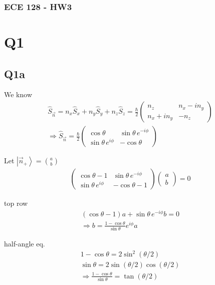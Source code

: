 \documentclass[
]{article}
\author{}
\date{}
\providecommand{\ket}[1]{\left\lvert #1 \right\rangle}
\providecommand{\Rarr}{\Rightarrow}
\begin{document}
\subsubsection*{ECE 128 - HW3}

\section{Q1}

\subsection{Q1a}

We know
\begin{gather*}
	\hat{S}_{\vec{n}}=n_x\hat{S}_x+n_y\hat{S}_y+n_z\hat{S}_z=\frac{\hbar}{2}\begin{pmatrix}n_z & n_x-in_y\\ n_x+in_y & -n_z\end{pmatrix}\\
	\Rarr\hat{S}_{\vec{n}}=\frac{\hbar}{2}\begin{pmatrix}\cos\theta & \sin\theta\,e^{-i\phi}\\ \sin\theta\,e^{i\phi} & -\cos\theta\end{pmatrix}
\end{gather*}

Let \(\ket{\vec{n}_+}=\binom{a}{b}\)
\begin{gather*}
	\begin{pmatrix}\cos\theta-1 & \sin\theta\,e^{-i\phi}\\ \sin\theta\,e^{i\phi} & -\cos\theta-1\end{pmatrix}\begin{pmatrix}a\\b\end{pmatrix}=0
\end{gather*}

top row
\begin{gather*}
	(\cos\theta-1)a+\sin\theta\,e^{-i\phi}b=0\\
	\Rarr b=\frac{1-\cos\theta}{\sin\theta}e^{i\phi}a
\end{gather*}

half-angle eq.
\begin{gather*}
	1-\cos\theta=2\sin^2(\theta/2)\\
	\sin\theta=2\sin(\theta/2)\cos(\theta/2)\\
	\Rarr\frac{1-\cos\theta}{\sin\theta}=\tan(\theta/2)
\end{gather*}
\end{document}
